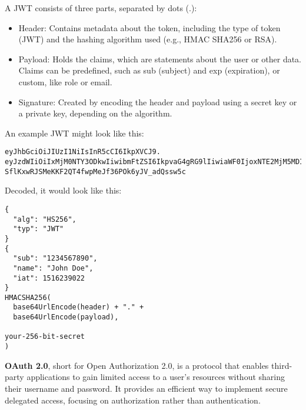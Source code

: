 A JWT consists of three parts, separated by dots (.):

\begin{itemize}
\item Header: Contains metadata about the token, including the type of token (JWT) and the hashing algorithm used (e.g., HMAC SHA256 or RSA).

\item Payload: Holds the claims, which are statements about the user or other data. Claims can be predefined, such as sub (subject) and exp (expiration), or custom, like role or email.

\item Signature: Created by encoding the header and payload using a secret key or a private key, depending on the algorithm.
\end{itemize}

An example JWT might look like this:

\begin{lstlisting}
eyJhbGciOiJIUzI1NiIsInR5cCI6IkpXVCJ9.
eyJzdWIiOiIxMjM0NTY3ODkwIiwibmFtZSI6IkpvaG4gRG9lIiwiaWF0IjoxNTE2MjM5MDIyfQ.
SflKxwRJSMeKKF2QT4fwpMeJf36POk6yJV_adQssw5c
\end{lstlisting}

Decoded, it would look like this:


\begin{lstlisting}
{
  "alg": "HS256",
  "typ": "JWT"
}
{
  "sub": "1234567890",
  "name": "John Doe",
  "iat": 1516239022
}
HMACSHA256(
  base64UrlEncode(header) + "." +
  base64UrlEncode(payload),

your-256-bit-secret
)
\end{lstlisting}

\textbf{OAuth 2.0}, short for Open Authorization 2.0, is a protocol that enables third-party applications to gain limited access to a user's resources without sharing their username and password. It provides an efficient way to implement secure delegated access, focusing on authorization rather than authentication.



\begin{lstlisting}

\end{lstlisting}





